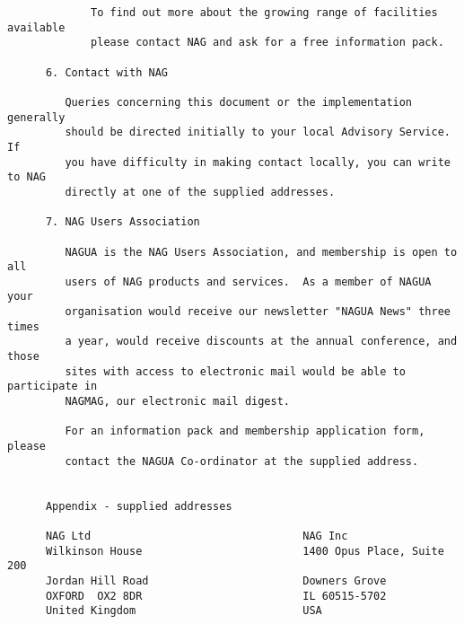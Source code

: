 \begin{small}
\begin{verbatim}
             To find out more about the growing range of facilities available   
             please contact NAG and ask for a free information pack.            
                                                                                
      6. Contact with NAG                                                       
                                                                                
         Queries concerning this document or the implementation generally       
         should be directed initially to your local Advisory Service.  If       
         you have difficulty in making contact locally, you can write to NAG    
         directly at one of the supplied addresses.                             
                                                                                
      7. NAG Users Association                                                  
                                                                                
         NAGUA is the NAG Users Association, and membership is open to all      
         users of NAG products and services.  As a member of NAGUA your         
         organisation would receive our newsletter "NAGUA News" three times     
         a year, would receive discounts at the annual conference, and those    
         sites with access to electronic mail would be able to participate in   
         NAGMAG, our electronic mail digest.                                    
                                                                                
         For an information pack and membership application form, please        
         contact the NAGUA Co-ordinator at the supplied address.                
                                                                                
                                                                                
      Appendix - supplied addresses                                             
                                                                                
      NAG Ltd                                 NAG Inc                           
      Wilkinson House                         1400 Opus Place, Suite 200        
      Jordan Hill Road                        Downers Grove                     
      OXFORD  OX2 8DR                         IL 60515-5702                     
      United Kingdom                          USA                               
                                                                                

\end{verbatim}
\end{small}

